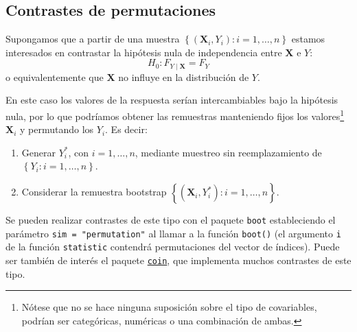 \documentclass[
]{book}
\theoremstyle{break}
\theoremstyle{nonumberplain}
\begin{document}
\hypertarget{contrastes-de-permutaciones}{%
\subsection{Contrastes de permutaciones}\label{contrastes-de-permutaciones}}

Supongamos que a partir de una muestra
\(\left\{ \left( \mathbf{X}_i, Y_i\right): i=1,\ldots, n \right\}\)
estamos interesados en contrastar la hipótesis nula de independencia
entre \(\mathbf{X}\) e \(Y\):
\[H_0: F_{Y \mid \mathbf{X}} = F_Y\]
o equivalentemente que \(\mathbf{X}\) no influye en la distribución de \(Y\).

En este caso los valores de la respuesta serían intercambiables bajo la hipótesis nula,
por lo que podríamos obtener las remuestras manteniendo fijos los valores\footnote{Nótese que
  no se hace ninguna suposición sobre el tipo de covariables,
  podrían ser categóricas, numéricas o una combinación de ambas.}
\(\mathbf{X}_i\) y permutando los \(Y_i\). Es decir:

\begin{enumerate}
\def\labelenumi{\arabic{enumi}.}
\item
  Generar \(Y^{\ast}_i\), con \(i=1,\ldots, n\), mediante muestreo
  sin reemplazamiento de \(\left\{ Y_i: i=1,\ldots, n \right\}\).
\item
  Considerar la remuestra bootstrap
  \(\left\{ \left( \mathbf{X}_i, Y^{\ast}_i\right): i=1,\ldots, n \right\}\).
\end{enumerate}

Se pueden realizar contrastes de este tipo con el paquete \texttt{boot} estableciendo
el parámetro \texttt{sim\ =\ "permutation"} al llamar a la función \texttt{boot()} (el argumento
\texttt{i} de la función \texttt{statistic} contendrá permutaciones del vector de índices).
Puede ser también de interés el paquete \href{https://cran.r-project.org/web/packages/coin/index.html}{\texttt{coin}},
que implementa muchos contrastes de este tipo.
\end{document}

